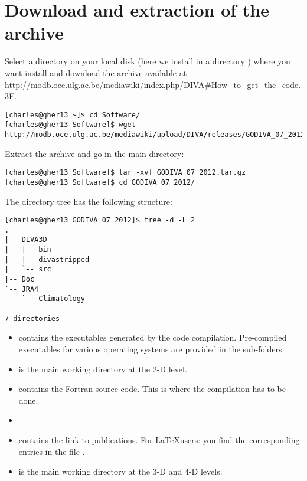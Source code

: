 \section{Download and extraction of the archive}
Select a directory on your local disk (here we install in a directory ) where you want install \diva and download the archive available at \url{http://modb.oce.ulg.ac.be/mediawiki/index.php/DIVA#How_to_get_the_code.3F}.

\begin{lstlisting}[style=Bash]
[charles@gher13 ~]$ cd Software/
[charles@gher13 Software]$ wget http://modb.oce.ulg.ac.be/mediawiki/upload/DIVA/releases/GODIVA_07_2012.tar.gz
\end{lstlisting}

Extract the archive and go in the main directory:
\begin{lstlisting}[style=Bash]
[charles@gher13 Software]$ tar -xvf GODIVA_07_2012.tar.gz
[charles@gher13 Software]$ cd GODIVA_07_2012/
\end{lstlisting}

The directory tree has the following structure: %
\begin{lstlisting}[style=Bash]
[charles@gher13 GODIVA_07_2012]$ tree -d -L 2
.
|-- DIVA3D
|   |-- bin
|   |-- divastripped
|   `-- src
|-- Doc
`-- JRA4
    `-- Climatology

7 directories
\end{lstlisting}


\begin{itemize}
\item {} contains the executables generated by the code compilation. Pre-compiled executables for various operating systems are provided in the sub-folders.
\item {} is the main working directory at the 2-D level. 
\item {} contains the Fortran source code. This is where the compilation has to be done.
\item[]
\item {} contains the link to publications. For \LaTeX users: you find the corresponding \BibTeX  entries in the file .
\item {} is the main working directory at the 3-D and 4-D levels.
\end{itemize}

